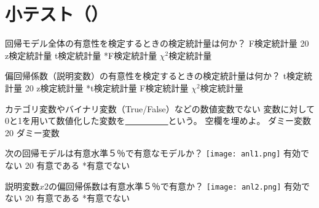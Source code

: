 \newcommand{\Release}{}
\newcommand{\Slide}{}
\newcommand{\PrintLecture}{1}
\newcommand{\PrintSolution}{0}







\maketitle

\section{小テスト（\MyClass）}

\begin{quiz}{\MyClass}

\QuizMultipleChoices
{
  回帰モデル全体の有意性を検定するときの検定統計量は何か？
}
{
  F検定統計量
}
{20}
{ z検定統計量}
{ t検定統計量}
{*F検定統計量}
{ $\chi^2$検定統計量}

\QuizMultipleChoices
{
  偏回帰係数（説明変数）の有意性を検定するときの検定統計量は何か？
}
{
  t検定統計量
}
{20}
{ z検定統計量}
{*t検定統計量}
{ F検定統計量}
{ $\chi^2$検定統計量}

\QuizShortAnswer
{
  カテゴリ変数やバイナリ変数（True/False）などの数値変数でない
  変数に対して0と1を用いて数値化した変数を\underline{　　　　　}という。
  空欄を埋めよ。
}
{
  ダミー変数
}
{20}
{ダミー変数}
{}
{}
{}

\QuizTrueFalse
{
  次の回帰モデルは有意水準５％で有意なモデルか？
  \texttt{[image: anl1.png]}
}
{
  有効でない
}
{20}
{ 有意である}
{*有意でない}

\QuizTrueFalse
{
  説明変数$x2$の偏回帰係数は有意水準５％で有意か？
  \texttt{[image: anl2.png]}
}
{
  有効でない
}
{20}
{ 有意である}
{*有意でない}

\end{quiz}


